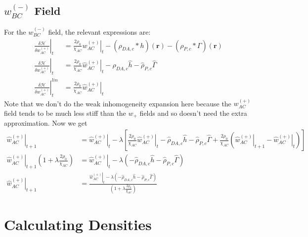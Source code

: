 \documentclass{article}
\begin{document}
  \subsection{$w_{BC}^{(-)}$ Field}
  
  For the $w_{BC}^{(-)}$ field, the relevant expressions are:
  \begin{align*}
    \left. \frac{\delta \mathcal{H}}{\delta w_{AC}^{(+)}} \right|_t &=
      \frac{2 \rho_0}{\chi_{AC}} \left. w_{AC}^{(+)} \right|_t
      - (\rho_{DA,c} \ast h)(\mathbf{r})
      - (\rho_{P,c} \ast \Gamma)(\mathbf{r}) \\
    \left. \hat{\frac{\delta \mathcal{H}}{\delta w_{AC}^{(+)}}} \right|_t &=
      \frac{2 \rho_0}{\chi_{AC}} \left. \hat{w}_{AC}^{(+)} \right|_t
      - \hat{\rho}_{DA,c} \hat{h}
      - \hat{\rho}_{P,c}  \hat{\Gamma} \\
    \left.
      \hat{\frac{\delta \mathcal{H}}{\delta w_{AC}^{(+)}}}
    \right| ^{lin}_t &=
      \frac{2\rho_0}{\chi_{AC}} \left. \hat{w}_{AC}^{(+)} \right|_t
  \end{align*}
  Note that we don't do the weak inhomogeneity expansion here because the
    $w_{AC}^{(+)}$ field tends to be much less stiff than the $w_+$ fields and so
    doesn't need the extra approximation.
  Now we get
  \begin{align*}
    \left. \hat{w}_{AC}^{(+)} \right|_{t+1} &=
      \left. \hat{w}_{AC}^{(+)} \right|_t - \lambda \left[
        \frac{2\rho_0}{\chi_{AC}} \left. \hat{w}_{AC}^{(+)} \right|_t
        - \hat{\rho}_{DA,c} \hat{h}
        - \hat{\rho}_{P,c}  \hat{\Gamma}
        + \frac{2\rho_0}{\chi_{AC}}
          ( \left. \hat{w}_{AC}^{(+)}\right|_{t+1}
            - \left. \hat{w}_{AC}^{(+)} \right|_t
          )
      \right] \\
    \left. \hat{w}_{AC}^{(+)} \right|_{t+1} ( 1 + \lambda \frac{2
      \rho_0}{\chi_{AC}} ) &=
      \left. \hat{w}_{AC}^{(+)} \right|_t - \lambda \left(
        - \hat{\rho}_{DA,c} \hat{h}
        - \hat{\rho}_{P,c}  \hat{\Gamma}
      \right) \\
    \left. \hat{w}_{AC}^{(+)} \right|_{t+1} &=
      \frac{
        \left. \hat{w}_{AC}^{(+)} \right|_t - \lambda \left(
          - \hat{\rho}_{DA,c} \hat{h}
          - \hat{\rho}_{P,c}  \hat{\Gamma}
        \right)
      }
      {
        \left( 1 + \lambda \frac{2 \rho_0}{\chi_{AC}} \right)
      }
  \end{align*}
  
  \section{Calculating Densities}
  
\end{document}
